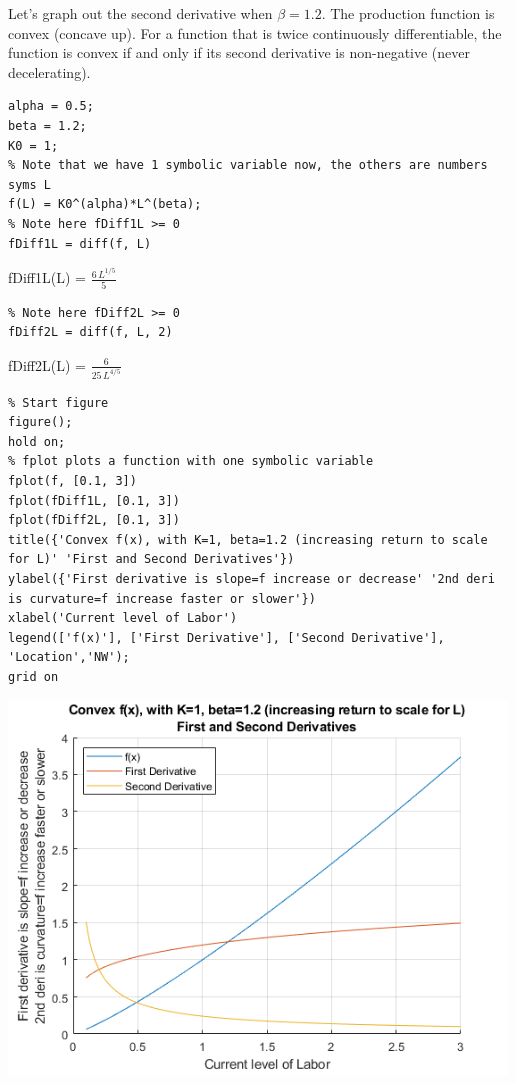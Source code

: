 \documentclass[
]{book}
\begin{document}
Let's graph out the second derivative when \(\beta =1.2\). The production
function is convex (concave up). For a function that is twice
continuously differentiable, the function is convex if and only if its
second derivative is non-negative (never decelerating).

\begin{verbatim}
alpha = 0.5;
beta = 1.2;
K0 = 1;
% Note that we have 1 symbolic variable now, the others are numbers
syms L
f(L) = K0^(alpha)*L^(beta);
% Note here fDiff1L >= 0
fDiff1L = diff(f, L)
\end{verbatim}

fDiff1L(L) = \(\displaystyle \frac{6\,L^{1/5} }{5}\)

\begin{verbatim}
% Note here fDiff2L >= 0
fDiff2L = diff(f, L, 2)
\end{verbatim}

fDiff2L(L) = \(\displaystyle \frac{6}{25\,L^{4/5} }\)

\begin{verbatim}
% Start figure
figure();
hold on;
% fplot plots a function with one symbolic variable
fplot(f, [0.1, 3])
fplot(fDiff1L, [0.1, 3])
fplot(fDiff2L, [0.1, 3])
title({'Convex f(x), with K=1, beta=1.2 (increasing return to scale for L)' 'First and Second Derivatives'})
ylabel({'First derivative is slope=f increase or decrease' '2nd deri is curvature=f increase faster or slower'})
xlabel('Current level of Labor')
legend(['f(x)'], ['First Derivative'], ['Second Derivative'], 'Location','NW');
grid on
\end{verbatim}

\includegraphics[width=5.20833in,height=\textheight]{img/second_derivative_images/figure_1.png}
\end{document}
